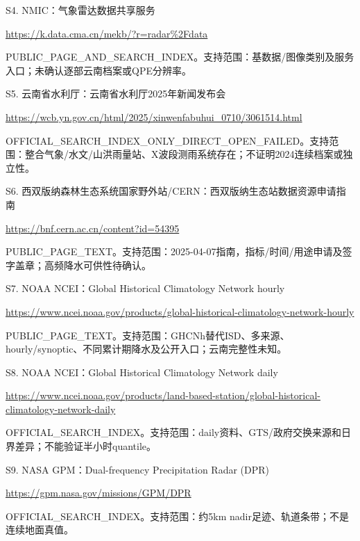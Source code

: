 \documentclass[UTF8,fontset=fandol,10pt]{ctexart}
\begin{document}
S4. NMIC：气象雷达数据共享服务\par\url{https://k.data.cma.cn/mekb/?r=radar\%2Fdata}\par PUBLIC\_\allowbreak{}PAGE\_\allowbreak{}AND\_\allowbreak{}SEARCH\_\allowbreak{}INDEX。支持范围：基数据/\allowbreak{}图像类别及服务入口；未确认逐部云南档案或QPE分辨率。\par\medskip

S5. 云南省水利厅：云南省水利厅2025年新闻发布会\par\url{https://wcb.yn.gov.cn/html/2025/xinwenfabuhui_0710/3061514.html}\par OFFICIAL\_\allowbreak{}SEARCH\_\allowbreak{}INDEX\_\allowbreak{}ONLY\_\allowbreak{}DIRECT\_\allowbreak{}OPEN\_\allowbreak{}FAILED。支持范围：整合气象/\allowbreak{}水文/\allowbreak{}山洪雨量站、X波段测雨系统存在；不证明2024连续档案或独立性。\par\medskip

S6. 西双版纳森林生态系统国家野外站/\allowbreak{}CERN：西双版纳生态站数据资源申请指南\par\url{https://bnf.cern.ac.cn/content?id=54395}\par PUBLIC\_\allowbreak{}PAGE\_\allowbreak{}TEXT。支持范围：2025-04-07指南，指标/\allowbreak{}时间/\allowbreak{}用途申请及签字盖章；高频降水可供性待确认。\par\medskip

S7. NOAA NCEI：Global Historical Climatology Network hourly\par\url{https://www.ncei.noaa.gov/products/global-historical-climatology-network-hourly}\par PUBLIC\_\allowbreak{}PAGE\_\allowbreak{}TEXT。支持范围：GHCNh替代ISD、多来源、hourly/\allowbreak{}synoptic、不同累计期降水及公开入口；云南完整性未知。\par\medskip

S8. NOAA NCEI：Global Historical Climatology Network daily\par\url{https://www.ncei.noaa.gov/products/land-based-station/global-historical-climatology-network-daily}\par OFFICIAL\_\allowbreak{}SEARCH\_\allowbreak{}INDEX。支持范围：daily资料、GTS/\allowbreak{}政府交换来源和日界差异；不能验证半小时quantile。\par\medskip

S9. NASA GPM：Dual-frequency Precipitation Radar (DPR)\par\url{https://gpm.nasa.gov/missions/GPM/DPR}\par OFFICIAL\_\allowbreak{}SEARCH\_\allowbreak{}INDEX。支持范围：约5km nadir足迹、轨道条带；不是连续地面真值。\par\medskip
\end{document}
